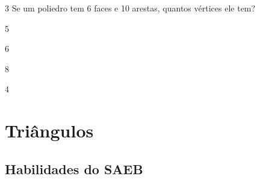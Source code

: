 \num{3} Se um poliedro tem 6 faces e 10 arestas, quantos vértices ele tem?

\begin{multicols}{2}
\begin{escolha}[itemsep=0pt]
\item 5
\item 6
\item 8
\item 4
\end{escolha}
\end{multicols}




\chapter{Triângulos}

\section*{Habilidades do SAEB }

